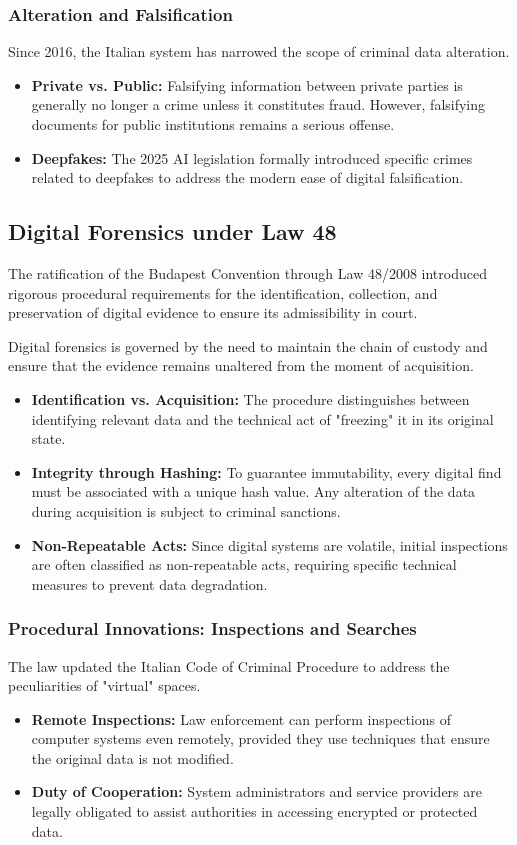 \subsubsection*{Alteration and Falsification}
Since 2016, the Italian system has narrowed the scope of criminal data alteration.
\begin{itemize}
    \item \textbf{Private vs. Public:} Falsifying information between private parties is generally no longer a crime unless it constitutes fraud. However, falsifying documents for public institutions remains a serious offense.
    \item \textbf{Deepfakes:} The 2025 AI legislation formally introduced specific crimes related to deepfakes to address the modern ease of digital falsification.
\end{itemize}


\subsection{Digital Forensics under Law 48}
The ratification of the Budapest Convention through Law 48/2008 introduced rigorous procedural requirements for the identification, collection, and preservation of digital evidence to ensure its admissibility in court.
\medskip

\noindent
Digital forensics is governed by the need to maintain the chain of custody and ensure that the evidence remains unaltered from the moment of acquisition.
\begin{itemize}
    \item \textbf{Identification vs. Acquisition:} The procedure distinguishes between identifying relevant data and the technical act of "freezing" it in its original state.
    \item \textbf{Integrity through Hashing:} To guarantee immutability, every digital find must be associated with a unique hash value. Any alteration of the data during acquisition is subject to criminal sanctions.
    \item \textbf{Non-Repeatable Acts:} Since digital systems are volatile, initial inspections are often classified as non-repeatable acts, requiring specific technical measures to prevent data degradation.
\end{itemize}

\subsubsection{Procedural Innovations: Inspections and Searches}
The law updated the Italian Code of Criminal Procedure to address the peculiarities of "virtual" spaces.
\begin{itemize}
    \item \textbf{Remote Inspections:} Law enforcement can perform inspections of computer systems even remotely, provided they use techniques that ensure the original data is not modified.
    \item \textbf{Duty of Cooperation:} System administrators and service providers are legally obligated to assist authorities in accessing encrypted or protected data.
\end{itemize}

